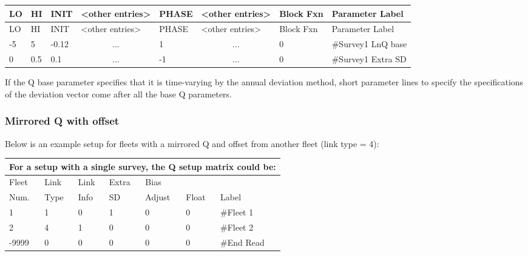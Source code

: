 \begin{longtable}{p{1cm} p{1cm} p{1cm} p{1.5cm} p{1.5cm} p{1.5cm} p{1.75cm} p{4cm}}
	\hline
	LO \Tstrut & HI & INIT & <other entries> & PHASE & <other entries> & Block Fxn & Parameter Label \Bstrut\\
	\hline
	\endfirsthead

	\hline
	LO \Tstrut & HI & INIT & <other entries> & PHASE & <other entries> &Block Fxn & Parameter Label \Bstrut\\
	\hline
	\endhead

	\hline
	\endfoot
	\endlastfoot

	-5 & 5 & -0.12 & \multicolumn{1}{c}{...} & 1 & \multicolumn{1}{c}{...} & 0 & \#Survey1 LnQ base \Tstrut\\
	0 & 0.5 & 0.1 & \multicolumn{1}{c}{...} & -1 & \multicolumn{1}{c}{...} & 0 & \#Survey1 Extra SD \Bstrut\\
	\hline
\end{longtable}

If the Q base parameter specifies that it is time-varying by the annual deviation method, short parameter lines to specify the specifications of the deviation vector come after all the base Q parameters.

\hypertarget{MirrorQoffset}{}
\subsubsection{Mirrored Q with offset}
Below is an example setup for fleets with a mirrored Q and offset from another fleet (link type = 4):
\begin{longtable}{p{2cm} p{2cm} p{2cm} p{2cm} p{2cm} p{1.3cm} p{2.3cm}}
	\multicolumn{7}{l}{For a setup with a single survey, the Q setup matrix could be:} \\
	\hline
	Fleet \Tstrut & Link & Link & Extra & Bias   & & \\
	Num.          & Type & Info & SD    & Adjust & Float & Label \Bstrut\\
	\hline
	1 & 1 & 0 & 1 & 0 & 0 & \#Fleet 1 \Tstrut\\
	2 & 4 & 1 & 0 & 0 & 0 & \#Fleet 2 \Tstrut\\
	-9999 & 0 & 0 & 0 & 0 & 0 & \#End Read \Bstrut\\
	\hline
\end{longtable}


